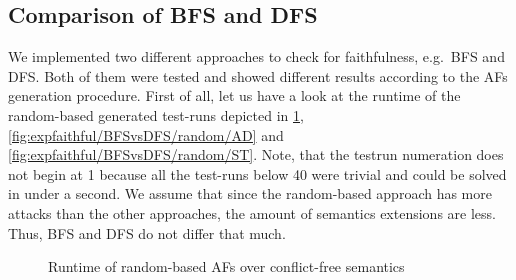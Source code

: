 \subsection{Comparison of BFS and DFS}
\label{subsec:faithfulComparisonBFSvsDFS}

\newcommand{\plotWidth}{10cm}
\newcommand{\plotHeight}{8cm}
\newcommand{\plotHeightSmall}{5cm}


We implemented two different approaches to check for faithfulness, e.g.\ BFS and DFS. Both of them were tested and showed different results according to the AFs generation procedure. First of all, let us have a look at the runtime of the random-based generated test-runs depicted in \cref{fig:expfaithful/BFSvsDFS/random/CF}, \cref{fig:expfaithful/BFSvsDFS/random/AD} and \cref{fig:expfaithful/BFSvsDFS/random/ST}.
Note, that the testrun numeration does not begin at 1 because all the test-runs below 40 were trivial and could be solved in under a second. We assume that since the random-based approach has more attacks than the other approaches, the amount of semantics extensions are less. Thus, BFS and DFS do not differ that much.




\begin{figure}[H]
    \centering
    \caption{Runtime of random-based AFs over conflict-free semantics}
    \label{fig:expfaithful/BFSvsDFS/random/CF}
\end{figure}


